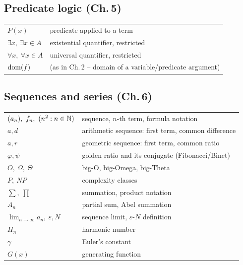 \documentclass[11pt]{article}
\begin{document}
\subsection*{Predicate logic (Ch.\,5)}
\begin{longtable}{ll}
$P(x)$ & predicate applied to a term \\
$\exists x,\ \exists x\in A$ & existential quantifier, restricted \\
$\forall x,\ \forall x\in A$ & universal quantifier, restricted \\
$\operatorname{dom}(f)$ & (as in Ch.\,2 -- domain of a variable/predicate argument) \\
\end{longtable}

\subsection*{Sequences and series (Ch.\,6)}
\begin{longtable}{ll}
$(a_n),\ f_n,\ (n^2:n\in\N)$ & sequence, $n$-th term, formula notation \\
$a,d$ & arithmetic sequence: first term, common difference \\
$a,r$ & geometric sequence: first term, common ratio \\
$\varphi,\psi$ & golden ratio and its conjugate (Fibonacci/Binet) \\
$O,\ \Omega,\ \Theta$ & big-O, big-Omega, big-Theta \\
$P,\ NP$ & complexity classes \\
$\sum,\ \prod$ & summation, product notation \\
$A_n$ & partial sum, Abel summation \\
$\lim_{n\to\infty}a_n,\ \varepsilon,N$ & sequence limit, $\varepsilon$-$N$ definition \\
$H_n$ & harmonic number \\
$\gamma$ & Euler's constant \\
$G(x)$ & generating function \\
\end{longtable}
\end{document}
